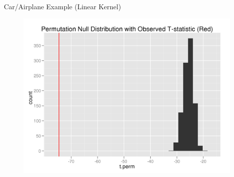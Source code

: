 \documentclass{beamer}
\begin{document}
\begin{frame}{Car/Airplane Example (Linear Kernel)}
  \begin{figure}
    \centering
    \includegraphics[scale=.6]{car-airplane-twosamp.png}
  \end{figure}
\end{frame}
\end{document}
